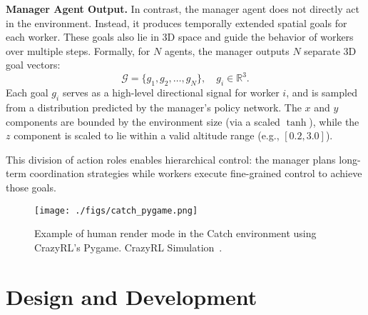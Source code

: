 \documentclass[12pt,a4paper,twoside,openany]{book}
\begin{document}
\textbf{Manager Agent Output.}
In contrast, the manager agent does not directly act in the environment. Instead, it produces temporally extended spatial goals for each worker. These goals also lie in 3D space and guide the behavior of workers over multiple steps. Formally, for $N$ agents, the manager outputs $N$ separate 3D goal vectors:
\[
\mathcal{G} = \{g_1, g_2, \dots, g_N\}, \quad g_i \in \mathbb{R}^3.
\]
Each goal $g_i$ serves as a high-level directional signal for worker $i$, and is sampled from a distribution predicted by the manager’s policy network. The $x$ and $y$ components are bounded by the environment size (via a scaled $\tanh$), while the $z$ component is scaled to lie within a valid altitude range (e.g., $[0.2, 3.0]$).

This division of action roles enables hierarchical control: the manager plans long-term coordination strategies while workers execute fine-grained control to achieve those goals.

\begin{figure}[h]
\centering
\texttt{[image: ./figs/catch\_pygame.png]}
\captionsetup{font=small}
\caption{Example of human render mode in the Catch environment using CrazyRL's Pygame. CrazyRL Simulation~\cite{CrazyRL}.}
\label{fig:catch_pygame}
\end{figure}

\section{Design and Development}
\end{document}

